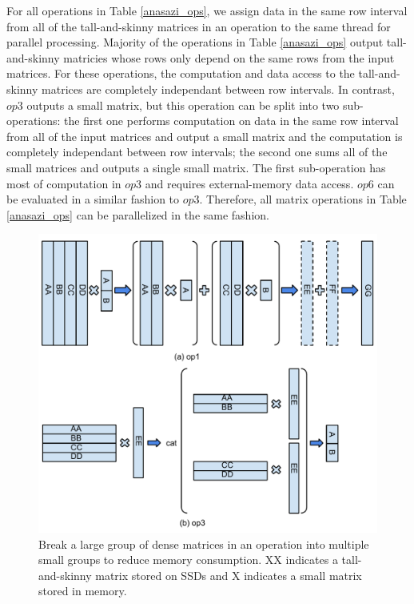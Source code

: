 For all operations in Table \ref{anasazi_ops}, we assign data in the same row
interval from all of the tall-and-skinny
matrices in an operation to the same thread for parallel processing.
Majority of the operations in Table \ref{anasazi_ops} output tall-and-skinny
matricies whose rows only depend on the same rows from the input matrices.
For these operations, the computation and data access to the tall-and-skinny
matrices are completely independant between row intervals. 
In contrast, $op3$ outputs a small matrix, but this operation can be split into
two sub-operations: the first one performs computation on data in the same row
interval from all of the input matrices and output a small matrix and the computation
is completely independant between row intervals; the second one sums all of
the small matrices and outputs a single small matrix. The first sub-operation
has most of computation in $op3$ and requires external-memory data access.
$op6$ can be evaluated in a similar fashion to $op3$. Therefore, all matrix
operations in Table \ref{anasazi_ops} can be parallelized in the same fashion.


\begin{figure}
\centering
\includegraphics[scale=0.4]{./mat_group.pdf}
\vspace{-5pt}
\caption{Break a large group of dense matrices in an operation into multiple
small groups to reduce memory consumption. XX indicates a tall-and-skinny matrix
stored on SSDs and X indicates a small matrix stored in memory.}
\vspace{-5pt}
\label{fig:mat_group}
\end{figure}

